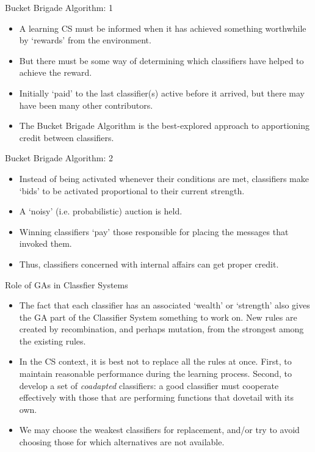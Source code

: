 \documentclass{article}
\begin{document}
\begin{slide}{}
{\Large Bucket Brigade Algorithm: 1}
\begin{itemize}
\item A learning CS must be
informed when it has achieved something worthwhile by `rewards' from
the environment.
\item But there must be some way of determining which
classifiers have helped to achieve the reward. 
\item Initially `paid'
to the last classifier(s) active before it arrived, but there may have
been many other contributors. 
\item The Bucket Brigade Algorithm is the
best-explored approach to apportioning credit between
classifiers.
\end{itemize}
\end{slide}

\begin{slide}{}
{\Large Bucket Brigade Algorithm: 2}
\begin{itemize}
\item Instead of being activated whenever their
conditions are met, classifiers make `bids' to be activated
proportional to their current strength. 
\item A `noisy' (i.e. probabilistic) auction is held. 
\item Winning
classifiers `pay' those responsible for placing the messages that
invoked them. 
\item Thus, classifiers concerned with internal affairs can
get proper credit.
\end{itemize}
\end{slide}

\begin{slide}{}
{\Large Role of GAs in Classfier Systems}
\begin{itemize}
\item The fact that each classifier has an associated `wealth' or `strength'
also gives the GA part of the Classifier System something to work
on. New rules are created by recombination, and perhaps mutation, from
the strongest among the existing rules. 
\item In the CS context, it
is best not to replace all the rules at once. First, to 
maintain reasonable performance during the learning process. Second,
to develop a set of {\em coadapted} classifiers: a
good classifier must cooperate effectively with those that are
performing functions that dovetail with its own. 
\item We may choose the
weakest classifiers for replacement, and/or try to avoid choosing
those for which alternatives are not available.
\end{itemize}
\end{slide}
\end{document}
